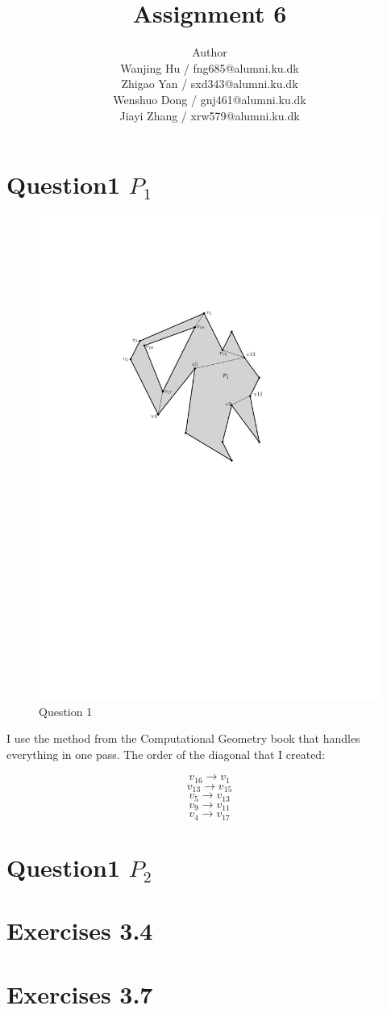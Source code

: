 \documentclass[12pt]{article}
\title{Assignment 6}
\author{Author \\
  Wanjing Hu / fng685@alumni.ku.dk  \\
  Zhigao Yan / sxd343@alumni.ku.dk  \\
  Wenshuo Dong / gnj461@alumni.ku.dk  \\
  Jiayi Zhang / xrw579@alumni.ku.dk \\
}
\begin{document}
\maketitle

\section{Question1 $P_1$}
\begin{figure}[h]
    \centering
    \includegraphics[width=0.5\linewidth]{triangulationExercise (2)-1.pdf}
    \caption{Question 1}
    \label{fig:enter-label}
\end{figure}
I use the method from the Computational Geometry book that handles everything in one pass.
The order of the diagonal that I created:

\[v_{16} \rightarrow v_1\]
\[v_{13} \rightarrow v_{15}\]
\[v_{5} \rightarrow v_{13}\]
\[v_{9} \rightarrow v_{11}\]
\[v_{4} \rightarrow v_{17}\]



\section{Question1 $P_2$}

\section{Exercises 3.4}

\section{Exercises 3.7}
\end{document}

